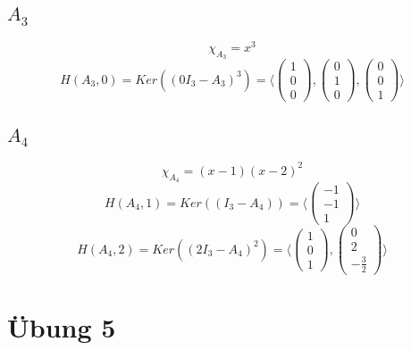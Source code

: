 \documentclass[10pt,a4paper]{article}
\begin{document}
\subsection*{$A_{3}$}

\begin{equation}
\chi_{A_{3}} = x^{3}
\end{equation}
\begin{equation}
H(A_{3}, 0) = Ker \left( (0I_{3} - A_{3})^{3} \right) = \langle
\begin{pmatrix}
1\\0\\0
\end{pmatrix},
\begin{pmatrix}
0\\1\\0
\end{pmatrix},
\begin{pmatrix}
0\\0\\1
\end{pmatrix}
\rangle
\end{equation}

\subsection*{$A_{4}$}

\begin{equation}
\chi_{A_{4}} = (x - 1)(x - 2)^{2}
\end{equation}
\begin{equation}
H(A_{4}, 1) = Ker \left( (I_{3} - A_{4}) \right) = \langle
\begin{pmatrix}
-1\\-1\\1
\end{pmatrix}
\rangle
\end{equation}
\begin{equation}
H(A_{4}, 2) = Ker \left( (2I_{3} - A_{4})^{2} \right) = \langle
\begin{pmatrix}
1\\0\\1
\end{pmatrix},
\begin{pmatrix}
0\\2\\-\frac{3}{2}
\end{pmatrix}
\rangle
\end{equation}

\section*{Übung 5}
\end{document}
